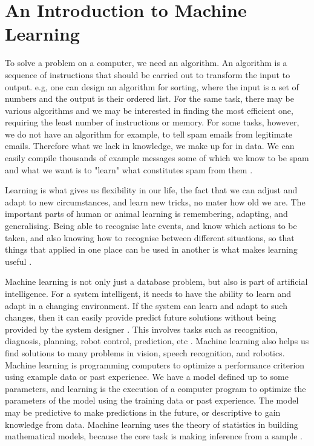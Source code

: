 \section{An Introduction to Machine Learning}
\label{Intro}

To solve a problem on a computer, we need an algorithm. An algorithm
is a sequence of instructions that should be carried out to transform
the input to output. e.g, one can design an algorithm for
sorting, where the input is a set of numbers and the output is their ordered
list. For the same task, there may be various algorithms and we may be
interested in finding the most efficient one, requiring the least number of
instructions or memory. For some tasks, however, we do not have an algorithm for example, to tell spam emails from legitimate emails. Therefore what we lack in knowledge, we make up for in data. We can easily compile thousands of example messages some of which we know to be spam and what we want is to "learn" what constitutes spam from them \citep{alpaydin2014introduction}. 

Learning is what gives us flexibility
in our life, the fact that we can adjust and adapt to new circumstances, and learn new
tricks, no mater how old we are. The important parts of human or animal learning is remembering, adapting, and generalising. Being able to recognise late events, and know which actions to be taken, and also knowing how to recognise between different situations, so that things that applied in one place can be used in another is what makes learning useful \citep{marsland2015machine}. 

 Machine learning is not only just a database problem, but also is part
of artificial intelligence. For a system intelligent, it needs to have the ability to learn and adapt in a changing environment. If the system can learn and
adapt to such changes, then it can easily provide predict future solutions without being provided by the system designer \citep{alpaydin2014introduction}. This involves tasks such as recognition, diagnosis,
planning, robot control, prediction, etc \citep{nilsson1996introduction}.
Machine learning also helps us find solutions to many problems in vision,
speech recognition, and robotics. Machine learning is programming computers to optimize a performance criterion using example data or past experience. We have a model defined
up to some parameters, and learning is the execution of a computer program
to optimize the parameters of the model using the training data or
past experience. The model may be predictive to make predictions in the
future, or descriptive to gain knowledge from data.
Machine learning uses the theory of statistics in building mathematical
models, because the core task is making inference from a sample \citep{alpaydin2014introduction}.


